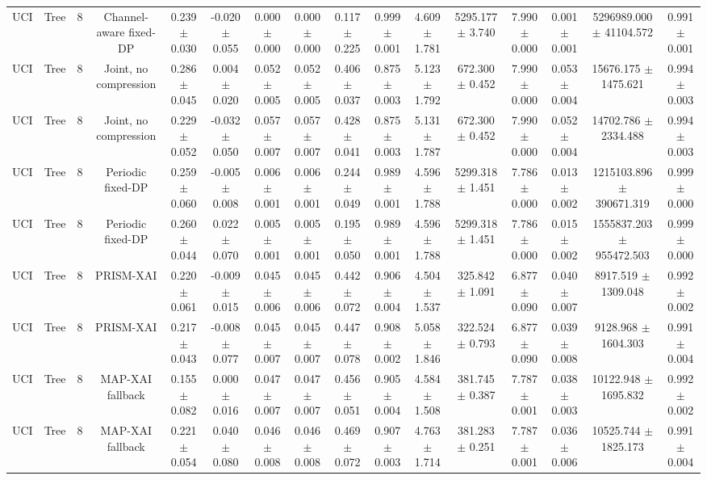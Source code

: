 \begin{tabular}{lccccccccccccccc}
UCI & Tree & 8 & Channel-aware fixed-DP & 0.239 $\pm$ 0.030 & -0.020 $\pm$ 0.055 & 0.000 $\pm$ 0.000 & 0.000 $\pm$ 0.000 & 0.117 $\pm$ 0.225 & 0.999 $\pm$ 0.001 & 4.609 $\pm$ 1.781 & 5295.177 $\pm$ 3.740 & 7.990 $\pm$ 0.000 & 0.001 $\pm$ 0.001 & 5296989.000 $\pm$ 41104.572 & 0.991 $\pm$ 0.001 \\
UCI & Tree & 8 & Joint, no compression & 0.286 $\pm$ 0.045 & 0.004 $\pm$ 0.020 & 0.052 $\pm$ 0.005 & 0.052 $\pm$ 0.005 & 0.406 $\pm$ 0.037 & 0.875 $\pm$ 0.003 & 5.123 $\pm$ 1.792 & 672.300 $\pm$ 0.452 & 7.990 $\pm$ 0.000 & 0.053 $\pm$ 0.004 & 15676.175 $\pm$ 1475.621 & 0.994 $\pm$ 0.003 \\
UCI & Tree & 8 & Joint, no compression & 0.229 $\pm$ 0.052 & -0.032 $\pm$ 0.050 & 0.057 $\pm$ 0.007 & 0.057 $\pm$ 0.007 & 0.428 $\pm$ 0.041 & 0.875 $\pm$ 0.003 & 5.131 $\pm$ 1.787 & 672.300 $\pm$ 0.452 & 7.990 $\pm$ 0.000 & 0.052 $\pm$ 0.004 & 14702.786 $\pm$ 2334.488 & 0.994 $\pm$ 0.003 \\
UCI & Tree & 8 & Periodic fixed-DP & 0.259 $\pm$ 0.060 & -0.005 $\pm$ 0.008 & 0.006 $\pm$ 0.001 & 0.006 $\pm$ 0.001 & 0.244 $\pm$ 0.049 & 0.989 $\pm$ 0.001 & 4.596 $\pm$ 1.788 & 5299.318 $\pm$ 1.451 & 7.786 $\pm$ 0.000 & 0.013 $\pm$ 0.002 & 1215103.896 $\pm$ 390671.319 & 0.999 $\pm$ 0.000 \\
UCI & Tree & 8 & Periodic fixed-DP & 0.260 $\pm$ 0.044 & 0.022 $\pm$ 0.070 & 0.005 $\pm$ 0.001 & 0.005 $\pm$ 0.001 & 0.195 $\pm$ 0.050 & 0.989 $\pm$ 0.001 & 4.596 $\pm$ 1.788 & 5299.318 $\pm$ 1.451 & 7.786 $\pm$ 0.000 & 0.015 $\pm$ 0.002 & 1555837.203 $\pm$ 955472.503 & 0.999 $\pm$ 0.000 \\
UCI & Tree & 8 & PRISM-XAI & 0.220 $\pm$ 0.061 & -0.009 $\pm$ 0.015 & 0.045 $\pm$ 0.006 & 0.045 $\pm$ 0.006 & 0.442 $\pm$ 0.072 & 0.906 $\pm$ 0.004 & 4.504 $\pm$ 1.537 & 325.842 $\pm$ 1.091 & 6.877 $\pm$ 0.090 & 0.040 $\pm$ 0.007 & 8917.519 $\pm$ 1309.048 & 0.992 $\pm$ 0.002 \\
UCI & Tree & 8 & PRISM-XAI & 0.217 $\pm$ 0.043 & -0.008 $\pm$ 0.077 & 0.045 $\pm$ 0.007 & 0.045 $\pm$ 0.007 & 0.447 $\pm$ 0.078 & 0.908 $\pm$ 0.002 & 5.058 $\pm$ 1.846 & 322.524 $\pm$ 0.793 & 6.877 $\pm$ 0.090 & 0.039 $\pm$ 0.008 & 9128.968 $\pm$ 1604.303 & 0.991 $\pm$ 0.004 \\
UCI & Tree & 8 & MAP-XAI fallback & 0.155 $\pm$ 0.082 & 0.000 $\pm$ 0.016 & 0.047 $\pm$ 0.007 & 0.047 $\pm$ 0.007 & 0.456 $\pm$ 0.051 & 0.905 $\pm$ 0.004 & 4.584 $\pm$ 1.508 & 381.745 $\pm$ 0.387 & 7.787 $\pm$ 0.001 & 0.038 $\pm$ 0.003 & 10122.948 $\pm$ 1695.832 & 0.992 $\pm$ 0.002 \\
UCI & Tree & 8 & MAP-XAI fallback & 0.221 $\pm$ 0.054 & 0.040 $\pm$ 0.080 & 0.046 $\pm$ 0.008 & 0.046 $\pm$ 0.008 & 0.469 $\pm$ 0.072 & 0.907 $\pm$ 0.003 & 4.763 $\pm$ 1.714 & 381.283 $\pm$ 0.251 & 7.787 $\pm$ 0.001 & 0.036 $\pm$ 0.006 & 10525.744 $\pm$ 1825.173 & 0.991 $\pm$ 0.004 \\
\bottomrule
\end{tabular}
